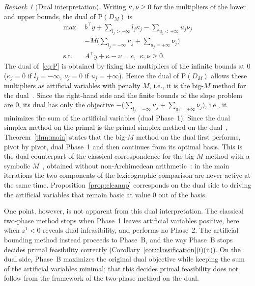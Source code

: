 \documentclass[11pt,a4paper]{article}
\theoremstyle{plain}
\theoremstyle{definition}
\theoremstyle{remark}
\newtheorem{remark}[theorem]{Remark}
\newcommand{\Pb}{\mathrm{P}}
\begin{document}
\begin{remark}[Dual interpretation]
\label{rem:dual}
Writing $\kappa,\nu\ge0$ for the multipliers of the lower and upper bounds, the dual of $\Pb(D_M)$ is
\begin{align*}
\max\ \ & b^\top y+\textstyle\sum_{l_j>-\infty}l_j\kappa_j-\sum_{u_j<+\infty}u_j\nu_j\\
&-M\textstyle\bigl(\sum_{l_j=-\infty}\kappa_j+\sum_{u_j=+\infty}\nu_j\bigr)\\
\text{s.t.}\ \ & A^\top y+\kappa-\nu=c,\ \ \kappa,\nu\ge0.
\end{align*}
The dual of~\eqref{eq:P} is obtained by fixing the multipliers of the infinite bounds at $0$ ($\kappa_j=0$ if $l_j=-\infty$, $\nu_j=0$ if $u_j=+\infty$). Hence the dual of $\Pb(D_M)$ allows these multipliers as artificial variables with penalty $M$, i.e., it is the big-$M$ method for the dual~\cite{koberstein2005}. Since the right-hand side and the finite bounds of the slope problem are $0$, its dual has only the objective $-\bigl(\sum_{l_j=-\infty}\kappa_j+\sum_{u_j=+\infty}\nu_j\bigr)$, i.e., it minimizes the sum of the artificial variables (dual Phase~1). Since the dual simplex method on the primal is the primal simplex method on the dual~\cite{lemke1954}, Theorem~\ref{thm:main} states that the big-$M$ method on the dual first performs, pivot by pivot, dual Phase~1 and then continues from its optimal basis. This is the dual counterpart of the classical correspondence for the big-$M$ method with a symbolic $M$~\cite{bazaraa2010}, obtained without non-Archimedean arithmetic~\cite{cococcioni2021}: in the main iterations the two components of the lexicographic comparison are never active at the same time. Proposition~\ref{prop:cleanup} corresponds on the dual side to driving the artificial variables that remain basic at value $0$ out of the basis.

One point, however, is not apparent from this dual interpretation. The classical two-phase method stops when Phase~1 leaves artificial variables positive, here when $z^1<0$ reveals dual infeasibility, and performs no Phase~2. The artificial bounding method instead proceeds to Phase~B, and the way Phase~B stops decides primal feasibility correctly (Corollary~\ref{cor:classification}(i)(ii)). On the dual side, Phase~B maximizes the original dual objective while keeping the sum of the artificial variables minimal; that this decides primal feasibility does not follow from the framework of the two-phase method on the dual.
\end{remark}
\end{document}
